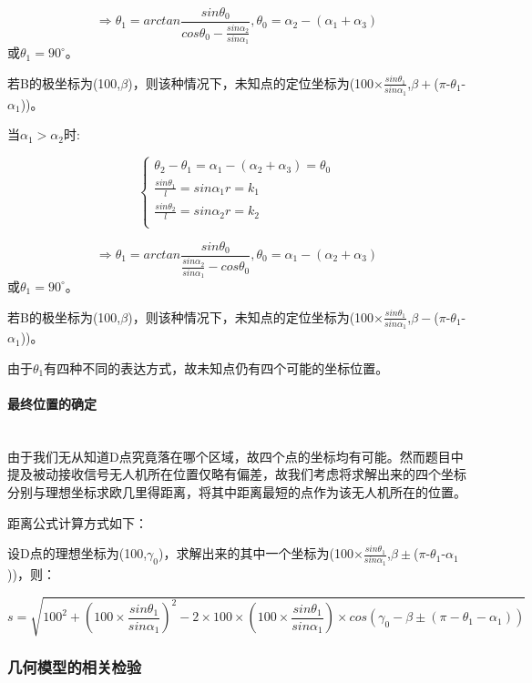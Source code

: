 \documentclass{ctexart}
\newcommand{\subsubsubsection}[1]{\paragraph{#1}\mbox{}\\}
\begin{document}
\[
    \Rightarrow \theta_1=arctan\frac{sin\theta_0}{cos\theta_0-\frac{sin\alpha_2}{sin\alpha_1}},\theta_0=\alpha_2-(\alpha_1+\alpha_3)
\]
或$\theta_1=90^{\circ}$。

若B的极坐标为(100,$\beta$)，则该种情况下，未知点的定位坐标为(100$\times\frac{sin\theta_1}{sin\alpha_1}$,$\beta +$($\pi$-$\theta_1$-$\alpha_1$))。


当$\alpha_1 > \alpha_2$时:

\begin{equation}
    \left\{
              \begin{array}{ll}
                \theta_2-\theta_1=\alpha_1-(\alpha_2+\alpha_3)=\theta_0\\
                \frac{sin\theta_1}{l}={sin\alpha_1}{r}=k_1\\
                \frac{sin\theta_2}{l}={sin\alpha_2}{r}=k_2\\

              \end{array}
            \right.
\end{equation}

\[
    \Rightarrow \theta_1=arctan\frac{sin\theta_0}{\frac{sin\alpha_2}{sin\alpha_1}-cos\theta_0},\theta_0=\alpha_1-(\alpha_2+\alpha_3)
\]
或$\theta_1=90^{\circ}$。

若B的极坐标为(100,$\beta$)，则该种情况下，未知点的定位坐标为(100$\times\frac{sin\theta_1}{sin\alpha_1}$,$\beta -$($\pi$-$\theta_1$-$\alpha_1$))。

由于$\theta_1$有四种不同的表达方式，故未知点仍有四个可能的坐标位置。 

\subsubsubsection{最终位置的确定}

由于我们无从知道D点究竟落在哪个区域，故四个点的坐标均有可能。然而题目中提及被动接收信号无人机所在位置仅略有偏差，故我们考虑将求解出来的四个坐标分别与理想坐标求欧几里得距离，将其中距离最短的点作为该无人机所在的位置。

距离公式计算方式如下：

设D点的理想坐标为(100,$\gamma_0$)，求解出来的其中一个坐标为(100$\times\frac{sin\theta_1}{sin\alpha_1}$,$\beta \pm$($\pi$-$\theta_1$-$\alpha_1$))，则：

\[
 s=\sqrt{100^2+(100\times\frac{sin\theta_1}{sin\alpha_1})^2-2\times100\times(100\times\frac{sin\theta_1}{sin\alpha_1})\times cos(\gamma_0-\beta \pm(\pi-\theta_1-\alpha_1))}
\]

\subsubsection{几何模型的相关检验}
\end{document}
